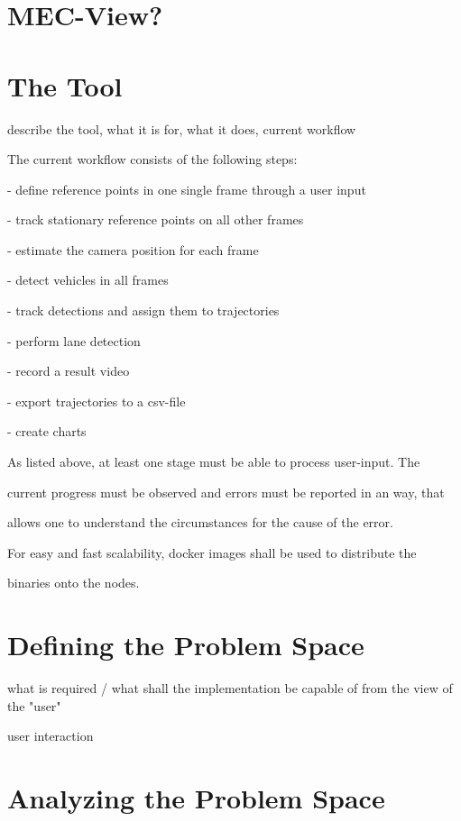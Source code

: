 \section{MEC-View?}

\section{The Tool}

describe the tool, what it is for, what it does, current workflow

The current workflow consists of the following steps:

- define reference points in one single frame through a user input

- track stationary reference points on all other frames

- estimate the camera position for each frame

- detect vehicles in all frames

- track detections and assign them to trajectories

- perform lane detection

- record a result video

- export trajectories to a csv-file

- create charts



As listed above, at least one stage must be able to process user-input. The

current progress must be observed and errors must be reported in an way, that

allows one to understand the circumstances for the cause of the error.

For easy and fast scalability, docker images shall be used to distribute the

binaries onto the nodes.


\section{Defining the Problem Space}

what is required / what shall the implementation be capable of from the view of the "user"

user interaction



\section{Analyzing the Problem Space}

